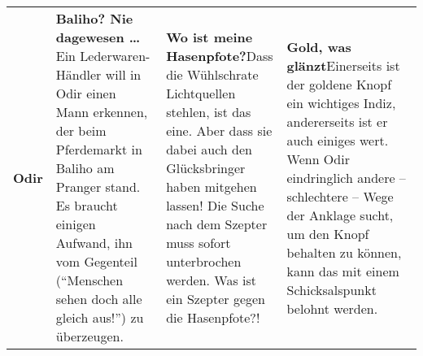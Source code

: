 \begin{tabularx}{0.98\linewidth}{l|XXX}
	\textbf{Odir}&\textbf{Baliho? Nie dagewesen \dots}\newline Ein Lederwaren-Händler will in Odir einen Mann erkennen, der beim Pferdemarkt in Baliho am Pranger stand. Es braucht einigen Aufwand, ihn vom Gegenteil (\enquote{Menschen sehen doch alle gleich aus!}) zu überzeugen.&\textbf{Wo ist meine Hasenpfote?}\newline Dass die Wühlschrate Lichtquellen stehlen, ist das eine. Aber dass sie dabei auch den Glücksbringer haben mitgehen lassen! Die Suche nach dem Szepter muss sofort unterbrochen werden. Was ist ein Szepter gegen die Hasenpfote?!&\textbf{Gold, was glänzt}\newline Einerseits ist der goldene Knopf ein wichtiges Indiz, andererseits ist er auch einiges wert. Wenn Odir eindringlich andere -- schlechtere -- Wege der Anklage sucht, um den Knopf behalten zu können, kann das mit einem Schicksalspunkt belohnt werden.\\
	
\end{tabularx}
